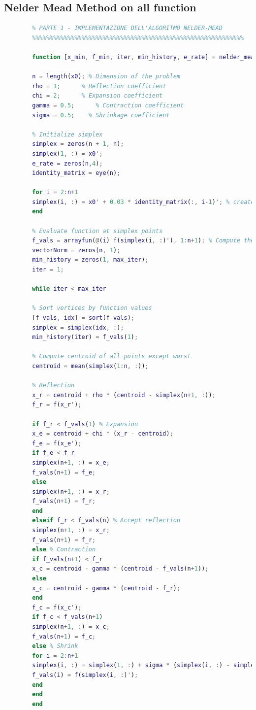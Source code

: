 \documentclass[a4paper,12pt]{article}
\begin{document}
	\subsection*{Nelder Mead Method on all function}
	\begin{lstlisting}[language=Matlab,caption={Full script: Nelder Mead Method on all function},label={lst:rosenbrock-extended}]
		%%%%%%%%%%%%%%%%%%%%%%%%%%%%%%%%%%%%%%%%%%%%%%%%%%%%%%%%%%%%
		% PARTE 1 - IMPLEMENTAZIONE DELL'ALGORITMO NELDER-MEAD
		%%%%%%%%%%%%%%%%%%%%%%%%%%%%%%%%%%%%%%%%%%%%%%%%%%%%%%%%%%%%
		
		function [x_min, f_min, iter, min_history, e_rate] = nelder_mead(f, x0, tol, max_iter)
		
		n = length(x0); % Dimension of the problem
		rho = 1;      % Reflection coefficient
		chi = 2;      % Expansion coefficient
		gamma = 0.5;      % Contraction coefficient
		sigma = 0.5;    % Shrinkage coefficient
		
		% Initialize simplex
		simplex = zeros(n + 1, n);
		simplex(1, :) = x0';
		e_rate = zeros(n,4);
		identity_matrix = eye(n); 
		
		for i = 2:n+1
		simplex(i, :) = x0' + 0.03 * identity_matrix(:, i-1)'; % create new points similar to the first one
		end
		
		% Evaluate function at simplex points
		f_vals = arrayfun(@(i) f(simplex(i, :)'), 1:n+1); % Compute the correspondent value of the function for each row (the same of sapply() in R) 
		vectorNorm = zeros(n, 1);
		min_history = zeros(1, max_iter);
		iter = 1;
		
		while iter < max_iter
		
		% Sort vertices by function values
		[f_vals, idx] = sort(f_vals);
		simplex = simplex(idx, :); 
		min_history(iter) = f_vals(1); 
		
		% Compute centroid of all points except worst
		centroid = mean(simplex(1:n, :)); 
		
		% Reflection
		x_r = centroid + rho * (centroid - simplex(n+1, :));
		f_r = f(x_r');
		
		if f_r < f_vals(1) % Expansion
		x_e = centroid + chi * (x_r - centroid);
		f_e = f(x_e');
		if f_e < f_r
		simplex(n+1, :) = x_e;
		f_vals(n+1) = f_e;
		else
		simplex(n+1, :) = x_r;
		f_vals(n+1) = f_r;
		end
		elseif f_r < f_vals(n) % Accept reflection
		simplex(n+1, :) = x_r;
		f_vals(n+1) = f_r;
		else % Contraction
		if f_vals(n+1) < f_r
		x_c = centroid - gamma * (centroid - f_vals(n+1));
		else
		x_c = centroid - gamma * (centroid - f_r);
		end
		f_c = f(x_c');
		if f_c < f_vals(n+1)
		simplex(n+1, :) = x_c;
		f_vals(n+1) = f_c;
		else % Shrink
		for i = 2:n+1
		simplex(i, :) = simplex(1, :) + sigma * (simplex(i, :) - simplex(1, :));
		f_vals(i) = f(simplex(i, :)');
		end
		end
		end
		

\end{lstlisting}
\end{document}

